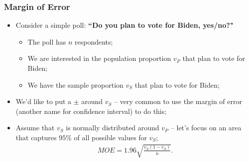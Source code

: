 \documentclass[aspectratio=169]{beamer}
\theoremstyle{principle}
\begin{document}
\begin{frame}
\frametitle{Margin of Error}

\begin{itemize}
\item Consider a simple poll: \textbf{``Do you plan to vote for Biden, yes/no?"}
\begin{itemize}
\item The poll has $n$ respondents;
\item We are interested in the population proportion $v_P$ that plan to vote for Biden;
\item We have the sample proportion $v_S$ that plan to vote for Biden;
\end{itemize}
\bigskip

\item We'd like to put a $\pm$ around $v_S$ -- very common to use the margin of error (another name for confidence interval) to do this;
\bigskip
\bigskip

\item Assume that $v_S$ is normally distributed around $v_P$ -- let's focus on an area that captures $95\%$ of all possible values for $v_S$;
\begin{align*}
MOE = 1.96\sqrt{\frac{v_S(1-v_S)}{n}}.
\end{align*}
\end{itemize}

\end{frame}
\end{document}
